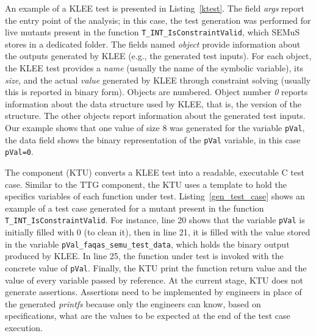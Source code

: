 An example of a KLEE test is presented in Listing~\ref{ktest}. The field \emph{args} report the entry point of the analysis; in this case, the test generation was performed for live mutants present in the function \texttt{T\_INT\_IsConstraintValid}, which SEMuS stores in a dedicated folder. The fields named \emph{object} provide information about the outputs generated by KLEE (e.g., the generated test inputs). 
For each object, the KLEE test provides a \emph{name} (usually the name of the symbolic variable), its \emph{size}, and the actual \emph{value} generated by KLEE through constraint solving (usually this is reported in binary form).
Objects are numbered. Object number \emph{0} reports information about the data structure used by KLEE, that is, the version of the structure. The other objects report information about the generated test inputs.
Our example shows that one value of size 8 was generated for the variable \texttt{pVal}, the data field shows the binary representation of the \texttt{pVal} variable, in this case \texttt{pVal=0}.






The component  (KTU) converts a KLEE test into a readable, executable C test case. Similar to the TTG component, the KTU uses a template to hold the specifics variables of each function under test. 
Listing~\ref{gen_test_case} shows an example of a test case generated for a mutant present in the function \texttt{T\_INT\_IsConstraintValid}. For instance, line 20 shows that the variable \texttt{pVal} is initially filled with 0 (to clean it), then in line 21, it is filled with the value stored in the variable \texttt{pVal\_faqas\_semu\_test\_data}, which holds the binary output produced by KLEE. In line 25, the function under test is invoked with the concrete value of \texttt{pVal}. Finally, the KTU print the function return value and the value of every variable passed by reference.
At the current stage, KTU does not generate assertions. Assertions need to be implemented by engineers in place of the generated \emph{printfs} because only the engineers can know, based on specifications, what are the values to be expected at the end of the test case execution.


